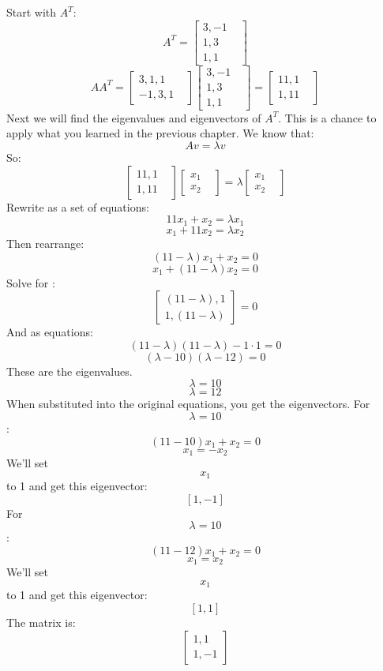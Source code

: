 Start with $A^T$:
$$ A^T = \begin{bmatrix}
3,-1 &  \\
1,3 &  \\
1,1& 
\end{bmatrix}$$
$$AA^T = \begin{bmatrix}
3,1,1 &  \\
 -1, 3,1& 
\end{bmatrix}
\begin{bmatrix}
3,-1 &  \\
1,3 &  \\
1,1& 
\end{bmatrix}
= \begin{bmatrix}
11,1 &  \\
 1, 11& 
\end{bmatrix}
$$
Next we will find the eigenvalues and eigenvectors of $A^T$. This is a chance to apply what you learned in the previous chapter. We know that:
\begin{equation}
Av = \lambda v
\end{equation}
So:
$$
\begin{bmatrix}
11,1 &  \\
 1, 11& 
\end{bmatrix}
\begin{bmatrix}
x_1 &  \\
x_2& 
\end{bmatrix}
=
\lambda 
\begin{bmatrix}
x_1 &  \\
x_2& 
\end{bmatrix}
$$
Rewrite as a set of equations:
$$11x_1 + x_2 = \lambda x_1$$
$$x_1 + 11x_2 = \lambda x_2$$
Then rearrange:
$$(11−\lambda )x_1 +x_2 =0$$
$$x_1 +(11−\lambda )x_2 =0 $$
Solve for \lambda :
$$\begin{bmatrix}
(11 -\lambda), 1 \\
 1, (11 -\lambda) 
\end{bmatrix} = 0$$
And as equations:
$$(11 − \lambda)(11 − \lambda) − 1 · 1 = 0$$
$$(\lambda − 10)(\lambda − 12) = 0$$
These are the eigenvalues.
$$\lambda = 10$$
$$\lambda = 12$$
When substituted into the original equations, you get the eigenvectors. For $$ \lambda = 10$$:
$$(11−10)x_1 +x_2 =0 $$
$$x_1 = -x_2$$
We'll set $$x_1$$ to 1 and get this eigenvector:
$$\left[ 1,-1 \right]$$
For $$ \lambda = 10$$:
$$(11−12)x_1 +x_2 =0  $$
$$x_1 = x_2 $$
We'll set $$x_1$$ to 1 and get this eigenvector:
$$\left[ 1,1 \right]$$
The matrix is:
$$
\begin{bmatrix}
1,1 \\
1,-1 
\end{bmatrix}
$$
